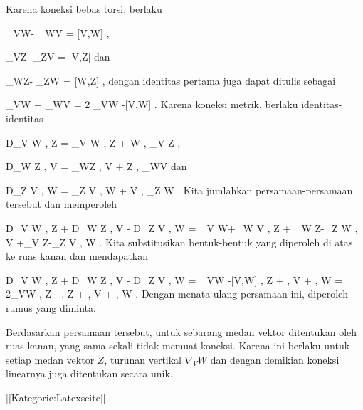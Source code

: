 {

Karena koneksi bebas torsi, berlaku

\mavergleichskettedisp
{\vergleichskette
{ \nabla_VW- \nabla_WV
}
{ =} { [V,W]
}
{ } {
}
{ } {
}
{ } {
}
}
{}{}{,}

\mavergleichskettedisp
{\vergleichskette
{ \nabla_VZ- \nabla_ZV
}
{ =} { [V,Z]
}
{ } {
}
{ } {
}
{ } {
}
}
{}{}{}
dan

\mavergleichskettedisp
{\vergleichskette
{ \nabla_WZ- \nabla_ZW
}
{ =} { [W,Z]
}
{ } {
}
{ } {
}
{ } {
}
}
{}{}{,}
dengan identitas pertama juga dapat ditulis sebagai

\mavergleichskettedisp
{\vergleichskette
{ \nabla_VW + \nabla_WV
}
{ =} { 2 \nabla_VW -[V,W]
}
{ } {
}
{ } {
}
{ } {
}
}
{}{}{}.
Karena koneksi metrik, berlaku identitas-identitas

\mavergleichskettedisp
{\vergleichskette
{ D_V \left\langle  W  ,  Z  \right\rangle
}
{ =} { \left\langle \nabla_V W , Z  \right\rangle  + \left\langle  W  ,  \nabla_V Z  \right\rangle
}
{ } {
}
{ } {
}
{ } {
}
}
{}{}{,}

\mavergleichskettedisp
{\vergleichskette
{ D_W \left\langle  Z  ,  V  \right\rangle
}
{ =} { \left\langle \nabla_WZ , V  \right\rangle  + \left\langle  Z  ,  \nabla_WV  \right\rangle
}
{ } {
}
{ } {
}
{ } {
}
}
{}{}{}
dan

\mavergleichskettedisp
{\vergleichskette
{ D_Z \left\langle  V  ,  W  \right\rangle
}
{ =} { \left\langle \nabla_Z V , W  \right\rangle  + \left\langle  V  ,  \nabla_Z W   \right\rangle
}
{ } {
}
{ } {
}
{ } {
}
}
{}{}{.}
Kita jumlahkan persamaan-persamaan tersebut dan memperoleh

\mavergleichskettedisphandlinks
{\vergleichskettedisphandlinks
{ D_V \left\langle  W  ,  Z  \right\rangle+ D_W \left\langle  Z  ,  V  \right\rangle  - D_Z \left\langle  V  ,  W  \right\rangle
}
{ =} { \left\langle \nabla_V W+\nabla_W V  ,  Z  \right\rangle + \left\langle \nabla_W Z-\nabla_Z W   ,  V  \right\rangle+\left\langle  \nabla_V Z-\nabla_Z V   ,  W  \right\rangle
}
{ } {
}
{ } {
}
{ } {
}
}
{}{}{.}
Kita substitusikan bentuk-bentuk yang diperoleh di atas ke ruas kanan dan mendapatkan

\mavergleichskettealignhandlinks
{\vergleichskettealignhandlinks
{ D_V \left\langle  W  ,  Z  \right\rangle+ D_W \left\langle  Z  ,  V  \right\rangle  - D_Z \left\langle  V  ,  W  \right\rangle
}
{ =} { \left{} \nabla_VW -[V,W]  ,  Z  \right\rangle + \left\langle  [W,Z]  ,  V  \right\rangle + \left\langle [V,Z]   ,  W  \right\rangle
}
{ =} { 2\left\langle  \nabla_VW   ,  Z  \right\rangle - \left\langle  [V,W]  ,  Z  \right\rangle + \left\langle  [W,Z]  ,  V  \right\rangle + \left\langle  [V,Z]   ,  W  \right\rangle
}
{ } {
}
{ } {
}
}
{}
{}{.}
Dengan menata ulang persamaan ini, diperoleh rumus yang diminta.

Berdasarkan persamaan tersebut,
 untuk sebarang medan vektor ditentukan oleh ruas kanan, yang sama sekali tidak memuat koneksi. Karena ini berlaku untuk setiap medan vektor $Z$, turunan vertikal $\nabla_V W$ dan dengan demikian koneksi linearnya juga ditentukan secara unik.

 }

 [[Kategorie:Latexseite]]
